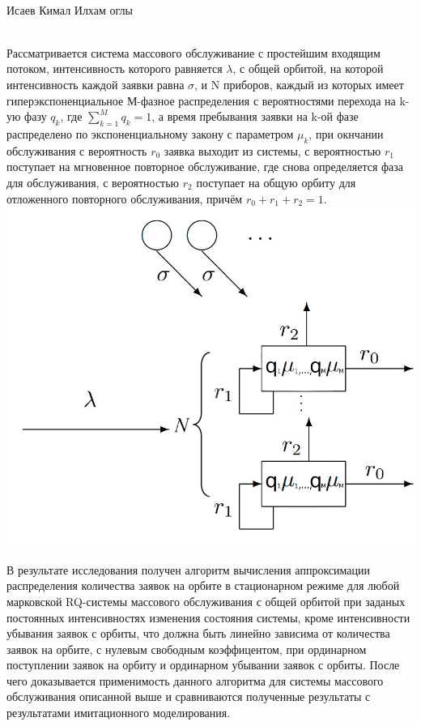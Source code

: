 \documentclass[a4paper, 12pt]{article}
\begin{document}
\begin{center}
\noindent
{\fontsize{14pt}{18pt}\selectfont 
	 \\
	Исаев Кимал Илхам оглы} \\ 
 \\
\end{center}

\noindent
\hspace{1cm}
Рассматривается система массового обслуживание с простейшим входящим потоком, интенсивность которого равняется \(\lambda\), с общей орбитой, на которой интенсивность каждой заявки равна \(\sigma\), и N приборов, каждый из которых имеет гиперэкспоненциальное М-фазное распределения с вероятностями перехода на k-ую фазу \(q_k\), где \(\sum_{k=1}^M q_k = 1\), а время пребывания заявки на k-ой фазе распределено по экспоненциальному закону с параметром \(\mu_k\), при окнчании обслуживания с вероятность \(r_0\) заявка выходит из системы, с вероятностью \(r_1\) поступает на мгновенное повторное обслуживание, где снова определяется фаза для обслуживания, с вероятностью \(r_2\) поступает на общую орбиту для отложенного повторного обслуживания, причём \(r_0 + r_1 + r_2 = 1\).
\\
\includegraphics[scale=0.5]{NExecutionMPhase}

\noindent
\hspace{1cm}
В результате исследования получен алгоритм вычисления аппроксимации распределения количества заявок на орбите в стационарном режиме для любой марковской RQ-системы массового обслуживания с общей орбитой при заданых постоянных интенсивностях изменения состояния системы, кроме интенсивности убывания заявок с орбиты, что должна быть линейно зависима от количества заявок на орбите, с нулевым свободным коэффицентом, при ординарном поступлении заявок на орбиту и ординарном убывании заявок с орбиты. После чего доказывается применимость данного алгоритма для системы массового обслуживания описанной выше и сравниваются полученные результаты с результатами имитационного моделирования.
\end{document}
